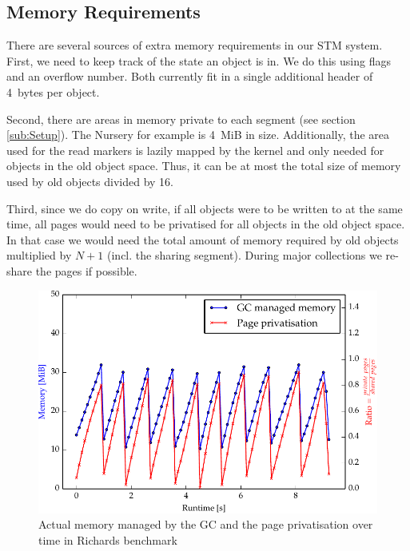 \documentclass{sigplanconf}
\begin{document}



\subsection{Memory Requirements}

There are several sources of extra memory requirements in our
STM system. First, we need to keep track of the state an object
is in. We do this using flags and an overflow number. Both currently
fit in a single additional header of 4~bytes per object.

Second, there are areas in memory private to each segment (see
section \ref{sub:Setup}). The Nursery for example is 4~MiB in
size. Additionally, the area used for the read markers is lazily
mapped by the kernel and only needed for objects in the old object
space. Thus, it can be at most the total size of memory used by
old objects divided by 16.

Third, since we do copy on write, if all objects were to be written to
at the same time, all pages would need to be privatised for all
objects in the old object space. In that case we would need the total
amount of memory required by old objects multiplied by $N+1$
(incl. the sharing segment). During major collections we re-share the
pages if possible.

\begin{figure}[h]
  \centering
  \includegraphics[width=1\columnwidth]{plots/richards_mem.pdf}
  \caption{Actual memory managed by the GC and the page privatisation
    over time in Richards benchmark\label{fig:richards_mem}}
\end{figure}
\end{document}
